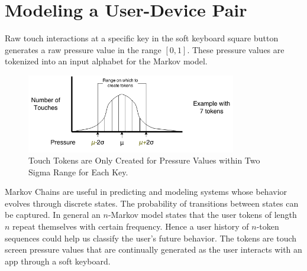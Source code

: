 \documentclass{acm_proc_article-sp}
\begin{document}



\section{Modeling a User-Device Pair}
\label{sec:modeling}
Raw touch interactions at a specific key in the soft keyboard square button
generates a raw pressure value in the range $[0,1]$. These pressure values are tokenized
into an input alphabet for the Markov model.
 
\begin{figure}
\centering
\includegraphics[width=3.6in]{token_creation.png}
\caption{Touch Tokens are Only Created for Pressure Values within Two Sigma Range for Each Key.}
\label{fig:token_creation}
\end{figure}

Markov Chains are useful in predicting and modeling systems whose behavior evolves through discrete states. 
The probability of transitions between states can be captured.
In general an $n$-Markov model states that the
user tokens of length $n$ repeat themselves with certain frequency.
Hence a user history of $n$-token sequences could help us classify the user's future behavior. The tokens are
touch screen pressure values that are continually generated as the user interacts with an app
through a soft keyboard.
\end{document}
